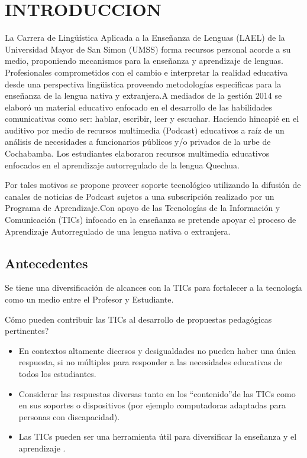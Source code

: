 \chapter{INTRODUCCION}

La Carrera de Ling\"{u}ística Aplicada a la Ense\~{n}anza de Lenguas (LAEL) de la Universidad Mayor de San Simon (UMSS)
forma recursos  personal acorde a su medio, proponiendo mecanismos para la ense\~{n}anza y aprendizaje de lenguas.
Profesionales comprometidos con el cambio e interpretar la realidad educativa desde una perspectiva ling\"{u}istica 
proveendo metodolog\'{i}as especificas para la ense\~{n}anza de la lengua nativa y extranjera.A mediados de la 
gesti\'{o}n 2014 se elabor\'{o} un material educativo enfocado en el desarrollo de las habilidades comunicativas como
ser: hablar, escribir, leer y escuchar. Haciendo hincapi\'{e} en el auditivo por medio de recursos multimedia (Podcast) 
educativos a ra\'{i}z de un an\'{a}lisis de necesidades a funcionarios p\'{u}blicos y/o privados de la urbe de Cochabamba.
Los estudiantes elaboraron recursos multimedia educativos enfocados en el aprendizaje autorregulado de la lengua Quechua.

Por tales motivos se propone proveer soporte tecnol\'{o}gico utilizando la difusi\'{o}n de canales de noticias de Podcast 
sujetos a una subscripci\'{o}n realizado por un Programa de Aprendizaje.Con apoyo de las Tecnolog\'{i}as de la Informaci\'{o}n
y Comunicaci\'{o}n (TICs) infocado en la ense\~{n}anza se pretende apoyar el proceso de Aprendizaje Autorregulado de una lengua
nativa o extranjera.

\section{Antecedentes}

Se tiene una diversificaci\'{o}n de alcances con la TICs para fortalecer a la tecnolog\'{i}a como un medio entre
el Profesor y Estudiante.

\textquestiondown C\'{o}mo pueden contribuir las TICs al desarrollo de propuestas pedag\'{o}gicas pertinentes?

\begin{itemize}
\item En contextos altamente dicersos y desigualdades no pueden haber una \'{u}nica respuesta,
si no m\'{u}ltiples para responder a las necesidades educativas de todos los estudiantes.
\item Considerar las respuestas diversas tanto en los \textquotedblleft contenido\textquotedblright  de las TICs como en sus soportes o dispositivos (por ejemplo computadoras adaptadas para personas con discapacidad).
\item Las TICs pueden ser una herramienta \'{u}til para diversificar la ense\~{n}anza y el aprendizaje
.\cite{severin2013enfoques}
\end{itemize}

